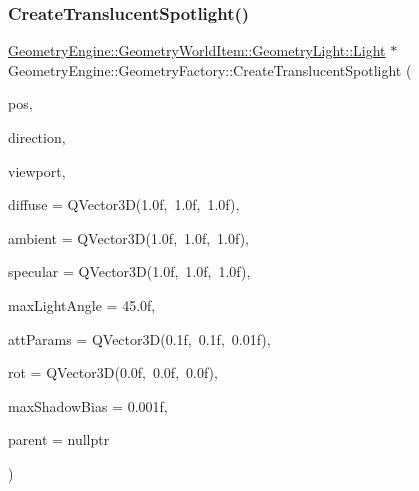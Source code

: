 \subsubsection{\texorpdfstring{CreateTranslucentSpotlight()}{CreateTranslucentSpotlight()}\hspace{0.1cm}{\footnotesize\ttfamily [2/2]}}
{\footnotesize\ttfamily \mbox{\hyperlink{class_geometry_engine_1_1_geometry_world_item_1_1_geometry_light_1_1_light}{Geometry\+Engine\+::\+Geometry\+World\+Item\+::\+Geometry\+Light\+::\+Light}} $\ast$ Geometry\+Engine\+::\+Geometry\+Factory\+::\+Create\+Translucent\+Spotlight (\begin{DoxyParamCaption}\item[{const Q\+Vector3D \&}]{pos,  }\item[{const Q\+Vector3D \&}]{direction,  }\item[{\mbox{\hyperlink{class_geometry_engine_1_1_geometry_item_utils_1_1_viewport}{Geometry\+Item\+Utils\+::\+Viewport}} $\ast$}]{viewport,  }\item[{const Q\+Vector3D \&}]{diffuse = {\ttfamily QVector3D(1.0f,~1.0f,~1.0f)},  }\item[{const Q\+Vector3D \&}]{ambient = {\ttfamily QVector3D(1.0f,~1.0f,~1.0f)},  }\item[{const Q\+Vector3D \&}]{specular = {\ttfamily QVector3D(1.0f,~1.0f,~1.0f)},  }\item[{float}]{max\+Light\+Angle = {\ttfamily 45.0f},  }\item[{const Q\+Vector3D \&}]{att\+Params = {\ttfamily QVector3D(0.1f,~0.1f,~0.01f)},  }\item[{const Q\+Vector3D \&}]{rot = {\ttfamily QVector3D(0.0f,~0.0f,~0.0f)},  }\item[{float}]{max\+Shadow\+Bias = {\ttfamily 0.001f},  }\item[{\mbox{\hyperlink{class_geometry_engine_1_1_geometry_world_item_1_1_world_item}{Geometry\+World\+Item\+::\+World\+Item}} $\ast$}]{parent = {\ttfamily nullptr} }\end{DoxyParamCaption})\hspace{0.3cm}{\ttfamily [static]}}

